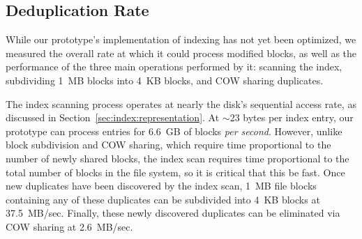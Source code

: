 


\subsection{Deduplication Rate}
\label{sec:dedup-rate}

While our prototype's implementation of indexing has not yet been
optimized, we measured the overall rate at which it could process
modified blocks, as well as the performance of the three main
operations performed by it: scanning the index, subdividing 1~MB
blocks into 4~KB blocks, and COW sharing duplicates.

The index scanning process operates at nearly the disk's sequential
access rate, as discussed in Section~\ref{sec:index:representation}.
At $\sim$23 bytes per index entry, our prototype can process entries for
6.6~GB of blocks \emph{per second}.  However, unlike block subdivision
and COW sharing, which require time proportional to the number of
newly shared blocks, the index scan requires time proportional to the
total number of blocks in the file system, so it is critical that this
be fast.  Once new duplicates have been discovered by the index scan,
1~MB file blocks containing any of these duplicates can be subdivided
into 4~KB blocks at 37.5~MB/sec.  Finally, these newly discovered
duplicates can be eliminated via COW sharing at 2.6~MB/sec.

